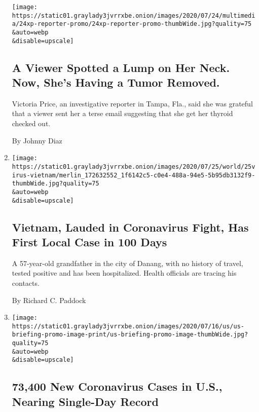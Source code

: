 \begin{enumerate}
  \texttt{[image: https://static01.graylady3jvrrxbe.onion/images/2020/07/24/multimedia/24xp-reporter-promo/24xp-reporter-promo-thumbWide.jpg?quality=75\\\&auto=webp\\\&disable=upscale]}

  \hypertarget{a-viewer-spotted-a-lump-on-her-neck-now-shes-having-a-tumor-removed}{%
  \subsection{A Viewer Spotted a Lump on Her Neck. Now, She's Having a
  Tumor
  Removed.}\label{a-viewer-spotted-a-lump-on-her-neck-now-shes-having-a-tumor-removed}}

  Victoria Price, an investigative reporter in Tampa, Fla., said she was
  grateful that a viewer sent her a terse email suggesting that she get
  her thyroid checked out.

  By Johnny Diaz
\item
  \href{/2020/07/25/world/asia/coronavirus-vietnam.html}{}

  \texttt{[image: https://static01.graylady3jvrrxbe.onion/images/2020/07/25/world/25virus-vietnam/merlin\_172632552\_1f6142c5-c0e4-488a-94e5-5b95db3132f9-thumbWide.jpg?quality=75\\\&auto=webp\\\&disable=upscale]}

  \hypertarget{vietnam-lauded-in-coronavirus-fight-has-first-local-case-in-100-days}{%
  \subsection{Vietnam, Lauded in Coronavirus Fight, Has First Local Case
  in 100
  Days}\label{vietnam-lauded-in-coronavirus-fight-has-first-local-case-in-100-days}}

  A 57-year-old grandfather in the city of Danang, with no history of
  travel, tested positive and has been hospitalized. Health officials
  are tracing his contacts.

  By Richard C. Paddock
\item
  \href{/2020/07/24/world/coronavirus-covid-19.html}{}

  \texttt{[image: https://static01.graylady3jvrrxbe.onion/images/2020/07/16/us/us-briefing-promo-image-print/us-briefing-promo-image-thumbWide.jpg?quality=75\\\&auto=webp\\\&disable=upscale]}

  \hypertarget{73400-new-coronavirus-cases-in-us-nearing-single-day-record}{%
  \subsection{73,400 New Coronavirus Cases in U.S., Nearing Single-Day
  Record}\label{73400-new-coronavirus-cases-in-us-nearing-single-day-record}}


\end{enumerate}
